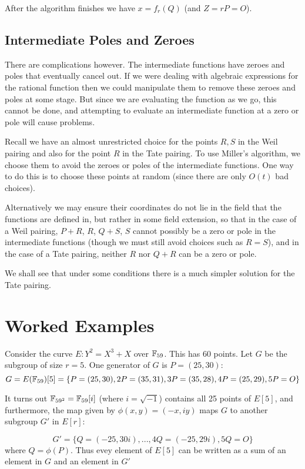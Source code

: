 After the algorithm finishes we have $x = f_r(Q)$ (and $Z = rP = O$).

\subsection {Intermediate Poles and Zeroes}

There are complications however. The intermediate functions have zeroes
and poles that eventually cancel out. If we were dealing with algebraic
expressions for the rational function then we could manipulate
them to remove these zeroes and poles at some stage.
But since we are evaluating the function as we go,
this cannot be done, and attempting to evaluate an
intermediate function at a zero
or pole will cause problems.

Recall we have an almost unrestricted choice for the points $R, S$ in
the Weil pairing and also for the point $R$
in the Tate pairing. To use Miller's algorithm, we choose them
to avoid the zeroes or poles
of the intermediate functions. One way to do this is to choose
these points at random (since there are only $O(t)$ bad choices).

Alternatively we may ensure their coordinates do not lie in the
field that the functions are defined in, but rather in some field
extension, so that in the case of a Weil pairing, $P+R$, $R$, $Q+S$, $S$
cannot possibly be a zero or pole in the intermediate functions
(though we must still avoid choices such as $R = S$),
and in the case of a Tate pairing, neither $R$ nor $Q + R$
can be a zero or pole.

We shall see that under some conditions there is a much simpler solution
for the Tate pairing.

\section {Worked Examples}

Consider the curve $E : Y^2 = X^3 + X$ over $\mathbb{F}_{59}$.
This has 60 points. Let $G$ be the subgroup of size $r = 5$.
One generator of $G$ is $P = (25, 30)$:
\[ G =
E(\mathbb{F}_{59})[5] =
\{P = (25, 30), 2P = (35, 31), 3P = (35, 28), 4P = (25, 29), 5P = O \} \]

It turns out $\mathbb{F}_{59^2} = \mathbb{F}_{59}[i]$ (where $i = \sqrt{-1}$) contains
all 25 points of $E[5]$, and furthermore, the map given by
$\phi(x,y) = (-x, i y)$ maps $G$ to another subgroup $G'$ in $E[r]$:

\[ G' =
\{Q = (-25, 30i), ..., 4Q = (-25, 29i), 5Q = O \} \]
where $Q = \phi(P)$.
Thus evey element of $E[5]$ can be written as a sum of an element in $G$
and an element in $G'$

